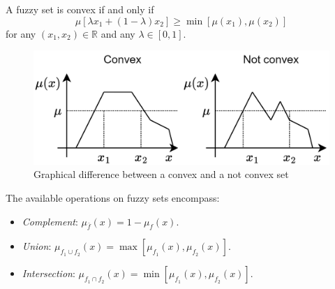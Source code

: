 \begin{definition}
    A fuzzy set is convex if and only if 
    \[\mu[\lambda x_1+(1-\lambda)x_2] \geq \min [\mu(x_1),\mu(x_2)]\]
    for any $(x_1,x_2) \in \mathbb{R}$ and any $\lambda \in [0,1]$.
\end{definition}
\begin{figure}[H]
    \centering
    \includegraphics[width=0.5\linewidth]{images/convex.png}
    \caption{Graphical difference between a convex and a not convex set}
\end{figure}
The available operations on fuzzy sets encompass:
\begin{itemize}
    \item \textit{Complement}: $\mu_{\bar{f}}(x)=1-\mu_f(x)$.
    \item \textit{Union}: $\mu_{f_1 \cup f_2}(x)=\max [\mu_{f_1}(x),\mu_{f_2}(x)]$.
    \item \textit{Intersection}: $\mu_{f_1 \cap f_2}(x)=\min [\mu_{f_1}(x),\mu_{f_2}(x)]$.
\end{itemize}